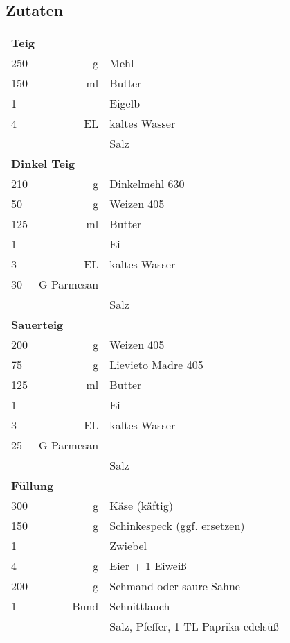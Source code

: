 \subsection*{Zutaten}
\begin{tabular}{lrl}
    \multicolumn{3}{l}{\textbf{Teig}}                      \\
    250 &          g & Mehl                                \\
    150 &         ml & Butter                              \\
    1   &            & Eigelb                              \\
    4   &         EL & kaltes Wasser                       \\
        &            & Salz                                \\
    \multicolumn{3}{l}{\textbf{Dinkel Teig}}               \\
    210 &          g & Dinkelmehl 630                      \\
    50  &          g & Weizen 405                          \\
    125 &         ml & Butter                              \\
    1   &            & Ei                                  \\
    3   &         EL & kaltes Wasser                       \\
    30  & G Parmesan &                                     \\
        &            & Salz                                \\
    \multicolumn{3}{l}{\textbf{Sauerteig}}                 \\
    200 &          g & Weizen 405                          \\
    75  &          g & Lievieto Madre 405                  \\
    125 &         ml & Butter                              \\
    1   &            & Ei                                  \\
    3   &         EL & kaltes Wasser                       \\
    25  & G Parmesan &                                     \\
        &            & Salz                                \\
    \multicolumn{3}{l}{\textbf{Füllung}}                   \\
    300 &          g & Käse (käftig)                       \\
    150 &          g & Schinkespeck (ggf. ersetzen)        \\
    1   &            & Zwiebel                             \\
    4   &          g & Eier + 1 Eiweiß                     \\
    200 &          g & Schmand oder saure Sahne            \\
    1   &       Bund & Schnittlauch                        \\
        &            & Salz, Pfeffer, 1 TL Paprika edelsüß
\end{tabular} 
